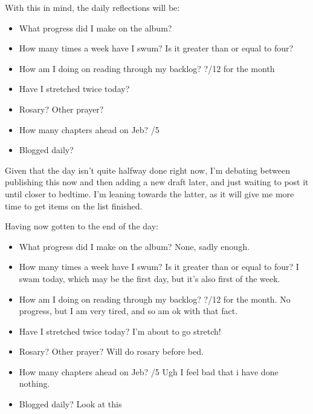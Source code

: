 \documentclass[12pt]{article}[titlepage]
\renewcommand{\,}{\textsuperscript{,}}
\begin{document}
With this in mind, the daily reflections will be:
\begin{itemize}
\item What progress did I make on the album?
\item How many times a week have I swum? Is it greater than or equal to four?
\item How am I doing on reading through my backlog? ?/12 for the month
\item Have I stretched twice today?
\item Rosary? Other prayer?
\item How many chapters ahead on Jeb? /5
\item Blogged daily?
\end{itemize}

Given that the day isn't quite halfway done right now, I'm debating between publishing this now and then adding a new draft later, and just waiting to post it until closer to bedtime.
I'm leaning towards the latter, as it will give me more time to get items on the list finished.

Having now gotten to the end of the day:

\begin{itemize}
\item What progress did I make on the album? None, sadly enough.
\item How many times a week have I swum? Is it greater than or equal to four? I swam today, which may be the first day, but it's also first of the week.
\item How am I doing on reading through my backlog? ?/12 for the month. No progress, but I am very tired, and so am ok with that fact.
\item Have I stretched twice today? I'm about to go stretch!
\item Rosary? Other prayer? Will do rosary before bed.
\item How many chapters ahead on Jeb? /5 Ugh I feel bad that i have done nothing.
\item Blogged daily? Look at this
\end{itemize}
\end{document}
